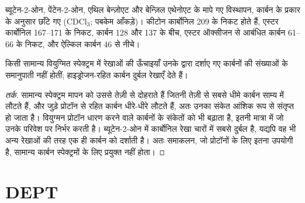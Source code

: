 \begin{omfigure}

{\small ब्यूटेन-2-ओन, पेंटेन-2-ओन, एथिल बेन्ज़ोएट और बेन्ज़िल एथेनोएट के मापे गए  विस्थापन,
कार्बन के प्रकार के अनुसार छाँटे गए (CDCl$_3$; पबकेम आँकड़े)। कीटोन कार्बोनिल 209 के निकट होते हैं, एस्टर कार्बोनिल
167--171 के निकट,  कार्बन 128 और 137 के बीच, एस्टर ऑक्सीजन से आबंधित कार्बन 61--66 के निकट, और
ऐल्किल कार्बन 46 से नीचे।}
\end{omfigure}

\begin{proposition}[ऊँचाइयाँ गिनतियाँ नहीं हैं]\label{prop:b2:structure-determination:intensities}
किसी सामान्य वियुग्मित  स्पेक्ट्रम में रेखाओं की ऊँचाइयाँ उनके द्वारा दर्शाए गए
कार्बनों की संख्याओं के समानुपाती नहीं होतीं; हाइड्रोजन-रहित कार्बन दुर्बल रेखाएँ देते हैं।
\end{proposition}

\begin{proof}[तर्क]
सामान्य स्पेक्ट्रम मापन को उससे तेज़ी से दोहराते हैं जितनी तेज़ी से सबसे धीमे कार्बन साम्य में लौटते हैं, और
जुड़े प्रोटॉन से रहित कार्बन धीरे-धीरे लौटते हैं, अतः उनका संकेत आंशिक रूप से संतृप्त हो जाता है। वियुग्मन
प्रोटॉन धारण करने वाले कार्बनों के संकेतों को भी बढ़ाता है, इतनी मात्रा में जो उनके परिवेश पर निर्भर करती है।
ब्यूटेन-2-ओन में कार्बोनिल रेखा चारों में सबसे दुर्बल है, यद्यपि वह भी अन्य रेखाओं की तरह एक ही कार्बन को दर्शाती है।
अतः समाकलन, जो प्रोटॉनों के लिए इतना उपयोगी है, सामान्य कार्बन स्पेक्ट्रमों के लिए प्रयुक्त नहीं होता।
\end{proof}

\section{DEPT}

